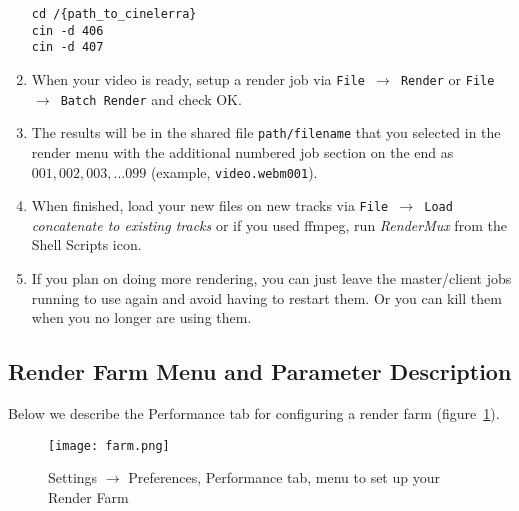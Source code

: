 \begin{enumerate}
\begin{lstlisting}[style=sh]
cd /{path_to_cinelerra}
cin -d 406
cin -d 407
    \end{lstlisting}
    \item When your video is ready, setup a render job via \texttt{File $\rightarrow$  Render} or \texttt{File $\rightarrow$  Batch Render} and check OK.
    \item The results will be in the shared file \texttt{path/filename} that you selected in the render menu with the
    additional numbered job section on the end as  $001, 002, 003, \dots 099$ (example, \texttt{video.webm001}).
    \item When finished, load your new files on new tracks via  \texttt{File  $\rightarrow$ Load} \textit{concatenate to existing tracks}  or if you used ffmpeg, run \textit{RenderMux} from the Shell Scripts icon.
    \item If you plan on doing more rendering, you can just leave the master/client jobs running to use again
    and avoid having to restart them.  Or you can kill them when you no longer are using them.
\end{enumerate}

\subsection{Render Farm Menu and Parameter Description}%
\label{sub:render_farm_parameter_description}

Below we describe the Performance tab for configuring a render farm (figure~\ref{fig:farm}).

\begin{figure}[htpb]
    \centering
    \texttt{[image: farm.png]}
    \caption{Settings $\rightarrow$ Preferences, Performance tab, menu to set up your Render Farm}
    \label{fig:farm}
\end{figure}

